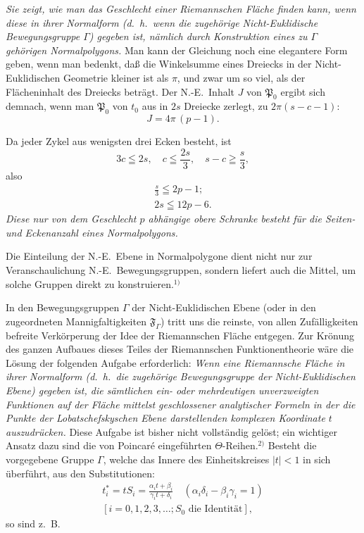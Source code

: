 \documentclass{article}
\begin{document}
\emph{Sie zeigt, wie man das Geschlecht einer Riemannschen Fläche finden kann, wenn diese in ihrer Normalform (d.~h.\ wenn die zugehörige Nicht-Euklidische Bewegungsgruppe $\varGamma$) gegeben ist, nämlich durch Konstruktion eines zu $\varGamma$ gehörigen Normalpolygons.} Man kann der Gleichung noch eine elegantere Form geben, wenn man bedenkt, daß die Winkelsumme eines Dreiecks in der Nicht-Euklidischen Geometrie kleiner ist als $\pi$, und zwar um so viel, als der Flächeninhalt des Dreiecks beträgt. Der N.-E.\ Inhalt $J$ von $\mathfrak{P}_0$ ergibt sich demnach, wenn man $\mathfrak{P}_0$ von $t_0$ aus in $2s$ Dreiecke zerlegt, zu $2\pi(s - c - 1)$:
\[ J = 4\pi\,(p - 1). \]

Da jeder Zykel aus wenigsten drei Ecken besteht, ist
\[ 3c \leqq 2s, \quad c \leqq \frac{2s}{3}, \quad s - c \geqq \frac{s}{3}, \]
also
\[ \begin{gathered} \frac{s}{3} \leqq 2p - 1; \\ 2s \leqq 12p - 6. \end{gathered} \]
\emph{Diese nur von dem Geschlecht $p$ abhängige obere Schranke besteht für die Seiten- und Eckenanzahl eines Normalpolygons.}

Die Einteilung der N.-E.\ Ebene in Normalpolygone dient nicht nur zur Veranschaulichung N.-E.\ Bewegungsgruppen, sondern liefert auch die Mittel, um solche Gruppen direkt zu konstruieren.${}^{1)}$

In den Bewegungsgruppen $\varGamma$ der Nicht-Euklidischen Ebene (oder in den zugeordneten Mannigfaltigkeiten $\mathfrak{F}_\varGamma$) tritt uns die reinste, von allen Zufälligkeiten befreite Verkörperung der Idee der Riemannschen Fläche entgegen. Zur Krönung des ganzen Aufbaues dieses Teiles der Riemannschen Funktionentheorie wäre die Lösung der folgenden Aufgabe erforderlich: \emph{Wenn eine Riemannsche Fläche in ihrer Normalform (d.~h.\ die zugehörige Bewegungsgruppe der Nicht-Euklidischen Ebene) gegeben ist, die sämtlichen ein- oder mehrdeutigen unverzweigten Funktionen auf der Fläche mittelst geschlossener analytischer Formeln in der die Punkte der Lobatschefskyschen Ebene darstellenden komplexen Koordinate $t$ auszudrücken.} Diese Aufgabe ist bisher nicht vollständig gelöst; ein wichtiger Ansatz dazu sind die von Poincaré eingeführten $\Theta$-Reihen.${}^{2)}$ Besteht die vorgegebene Gruppe $\varGamma$, welche das Innere des Einheitskreises $|t| < 1$ in sich überführt, aus den Substitutionen:
\[ \begin{gathered} t_i^* = tS_i = \frac{\alpha_i t + \beta_i}{\gamma_i t + \delta_i} \quad (\alpha_i\delta_i - \beta_i\gamma_i = 1) \\ [i = 0, 1, 2, 3, \dots; S_0 \text{ die Identität}], \end{gathered} \]
so sind z.~B.
\end{document}
